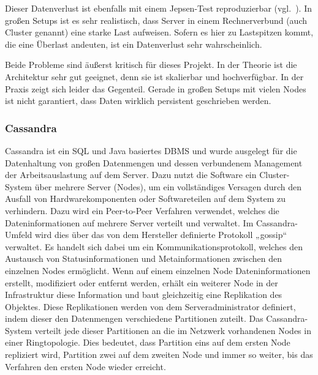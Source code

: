 Dieser Datenverlust ist ebenfalls mit einem Jepsen-Test reproduzierbar
(vgl.~\cite{es_jepsen_pause}). In großen Setups ist es sehr realistisch, dass
Server in einem Rechnerverbund (auch Cluster genannt) eine starke Last
aufweisen. Sofern es hier zu Lastspitzen kommt, die eine Überlast andeuten, ist
ein Datenverlust sehr wahrscheinlich.

Beide Probleme sind äußerst kritisch für dieses Projekt. In der Theorie ist die
Architektur sehr gut geeignet, denn sie ist skalierbar und hochverfügbar. In
der Praxis zeigt sich leider das Gegenteil. Gerade in großen Setups mit vielen
Nodes ist nicht garantiert, dass Daten wirklich persistent geschrieben werden.
\tm%

\subsubsection{Cassandra}
\label{subsubsec:cassandra}
Cassandra ist ein \gls{SQL} und Java basiertes \gls{DBMS} und wurde ausgelegt
für die Datenhaltung von großen Datenmengen und dessen verbundenem
Management der Arbeitsauslastung auf dem Server. Dazu nutzt die Software ein
Cluster-System über mehrere Server (Nodes), um ein vollständiges Versagen durch
den Ausfall von Hardwarekomponenten oder Softwareteilen auf dem System zu
verhindern. Dazu wird ein \gls{Peer-to-Peer} Verfahren verwendet, welches die
Dateninformationen auf mehrere Server verteilt und verwaltet. Im
Cassandra-Umfeld wird dies über das von dem Hersteller definierte Protokoll
„gossip“ verwaltet. Es handelt sich dabei um ein Kommunikationsprotokoll,
welches den Austausch von Statusinformationen und Metainformationen zwischen den
einzelnen Nodes ermöglicht. Wenn auf einem einzelnen Node Dateninformationen
erstellt, modifiziert oder entfernt werden, erhält ein weiterer Node in der
Infrastruktur diese Information und baut gleichzeitig eine Replikation des
Objektes. Diese Replikationen werden von dem Serveradministrator definiert,
indem dieser den Datenmengen verschiedene \gls{Partitionen} zuteilt. Das
Cassandra-System verteilt jede dieser \gls{Partitionen} an die im Netzwerk
vorhandenen Nodes in einer \gls{Ringtopologie}. Dies bedeutet, dass Partition
eins auf dem ersten Node repliziert wird, Partition zwei auf dem zweiten Node
und immer so weiter, bis das Verfahren den ersten Node wieder erreicht.

\begin{center}
    \inputminted{text}{../listings/cassandra-status.txt}
\end{center}

